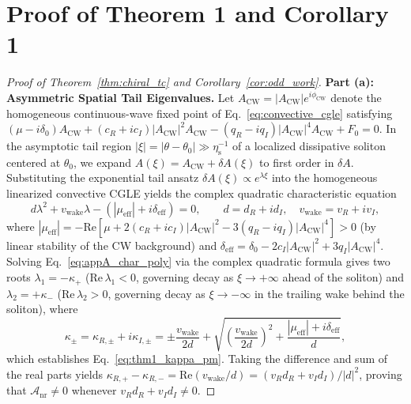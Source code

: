 \documentclass[11pt,letterpaper]{article}
\begin{document}
\appendix

\section{Proof of Theorem 1 and Corollary 1}
\label{app:proof_thm1}

\begin{proof}[Proof of Theorem~\ref{thm:chiral_tc} and Corollary~\ref{cor:odd_work}]
\textbf{Part (a): Asymmetric Spatial Tail Eigenvalues.}
Let $A_{\mathrm{CW}} = |A_{\mathrm{CW}}|e^{i\phi_{\mathrm{CW}}}$ denote the homogeneous continuous-wave fixed point of Eq.~\eqref{eq:convective_cgle} satisfying $(\mu - i\delta_0)A_{\mathrm{CW}} + (c_R + i c_I)|A_{\mathrm{CW}}|^2 A_{\mathrm{CW}} - (q_R - i q_I)|A_{\mathrm{CW}}|^4 A_{\mathrm{CW}} + F_0 = 0$. In the asymptotic tail region $|\xi| = |\theta - \theta_0| \gg \eta_{\mathrm{s}}^{-1}$ of a localized dissipative soliton centered at $\theta_0$, we expand $A(\xi) = A_{\mathrm{CW}} + \delta A(\xi)$ to first order in $\delta A$. Substituting the exponential tail ansatz $\delta A(\xi) \propto e^{\lambda\xi}$ into the homogeneous linearized convective CGLE yields the complex quadratic characteristic equation
\begin{equation}
d\lambda^2 + v_{\mathrm{wake}}\lambda - \left(|\mu_{\mathrm{eff}}| + i\delta_{\mathrm{eff}}\right) = 0, \qquad d = d_R + i d_I, \quad v_{\mathrm{wake}} = v_R + i v_I,
\label{eq:appA_char_poly}
\end{equation}
where $|\mu_{\mathrm{eff}}| = -\mathrm{Re}[\mu + 2(c_R + i c_I)|A_{\mathrm{CW}}|^2 - 3(q_R - i q_I)|A_{\mathrm{CW}}|^4] > 0$ (by linear stability of the CW background) and $\delta_{\mathrm{eff}} = \delta_0 - 2c_I|A_{\mathrm{CW}}|^2 + 3q_I|A_{\mathrm{CW}}|^4$. Solving Eq.~\eqref{eq:appA_char_poly} via the complex quadratic formula gives two roots $\lambda_1 = -\kappa_+$ ($\mathrm{Re}\,\lambda_1 < 0$, governing decay as $\xi \to +\infty$ ahead of the soliton) and $\lambda_2 = +\kappa_-$ ($\mathrm{Re}\,\lambda_2 > 0$, governing decay as $\xi \to -\infty$ in the trailing wake behind the soliton), where
\begin{equation}
\kappa_\pm = \kappa_{R,\pm} + i\kappa_{I,\pm} = \pm\frac{v_{\mathrm{wake}}}{2d} + \sqrt{\left(\frac{v_{\mathrm{wake}}}{2d}\right)^2 + \frac{|\mu_{\mathrm{eff}}| + i\delta_{\mathrm{eff}}}{d}},
\label{eq:appA_kappa_pm}
\end{equation}
which establishes Eq.~\eqref{eq:thm1_kappa_pm}. Taking the difference and sum of the real parts yields $\kappa_{R,+} - \kappa_{R,-} = \mathrm{Re}(v_{\mathrm{wake}}/d) = (v_R d_R + v_I d_I)/|d|^2$, proving that $\mathcal{A}_{\mathrm{nr}} \neq 0$ whenever $v_R d_R + v_I d_I \neq 0$.


\end{proof}
\end{document}
